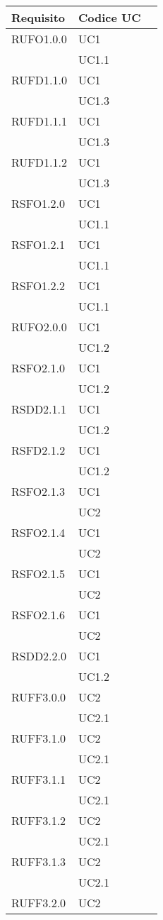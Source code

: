 \begin{center}
\begin{longtable}{lp{}l}
\toprule Requisito & Codice UC\\
\midrule
RUFO1.0.0 & UC1 \\
 & UC1.1 \\
RUFD1.1.0 & UC1 \\
 & UC1.3 \\
RUFD1.1.1 & UC1 \\
 & UC1.3 \\
RUFD1.1.2 & UC1 \\
 & UC1.3 \\
RSFO1.2.0 & UC1 \\
 & UC1.1 \\
RSFO1.2.1 & UC1 \\
 & UC1.1 \\
RSFO1.2.2 & UC1 \\
 & UC1.1 \\ 
RUFO2.0.0 & UC1 \\
 & UC1.2 \\
RSFO2.1.0 & UC1 \\
 & UC1.2 \\
RSDD2.1.1 & UC1 \\
 & UC1.2 \\
RSFD2.1.2 & UC1 \\
 & UC1.2 \\
RSFO2.1.3 & UC1\\
 & UC2\\
RSFO2.1.4 & UC1\\
 & UC2\\
RSFO2.1.5 & UC1\\
 & UC2\\
RSFO2.1.6 & UC1\\
 & UC2\\
RSDD2.2.0 & UC1 \\
 & UC1.2 \\
RUFF3.0.0 & UC2 \\
 & UC2.1 \\
RUFF3.1.0 & UC2 \\
 & UC2.1 \\
RUFF3.1.1 & UC2 \\
 & UC2.1 \\
RUFF3.1.2 & UC2 \\
 & UC2.1 \\
RUFF3.1.3 & UC2 \\
 & UC2.1 \\
RUFF3.2.0 & UC2 \\

\end{longtable}
\end{center}
